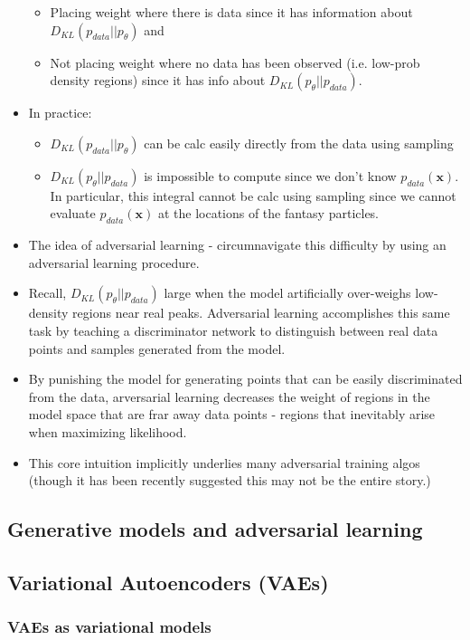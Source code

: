 \documentclass[norsk,a4paper,11pt]{article}
\begin{document}
\begin{itemize}
	\begin{itemize}
		\item Placing weight where there is data since it has information about $D_{KL}(p_{data}|| p_\theta)$ and
		\item Not placing weight where no data has been observed (i.e. low-prob density regions) since it has info about $D_{KL}(p_\theta || p_{data})$.
	\end{itemize}
	\item In practice:
	\begin{itemize}
		\item $D_{KL}(p_{data}|| p_\theta)$ can be calc easily directly from the data using sampling
		\item $D_{KL}(p_\theta || p_{data})$ is impossible to compute since we don't know $p_{data} (\bm{x})$. In particular, this integral cannot be calc using sampling since we cannot evaluate $p_{data}(\bm{x})$ at the locations of the fantasy particles. 
	\end{itemize} 
	\item The idea of adversarial learning - circumnavigate this difficulty by using an adversarial learning procedure. 
	\item Recall, $D_{KL}(p_\theta || p_{data})$ large when the model artificially over-weighs low-density regions near real peaks. Adversarial learning accomplishes this same task by teaching a discriminator network to distinguish between real data points and samples generated from the model.
	\item By punishing the model for generating points that can be easily discriminated from the data, arversarial learning decreases the weight of regions in the model space that are frar away data points - regions that inevitably arise when maximizing likelihood.
	\item This core intuition implicitly underlies many adversarial training algos (though it has been recently suggested this may not be the entire story.)
\end{itemize}

\subsection{Generative models and adversarial learning}

\subsection{Variational Autoencoders (VAEs)}
\subsubsection{VAEs as variational models}
\end{document}

